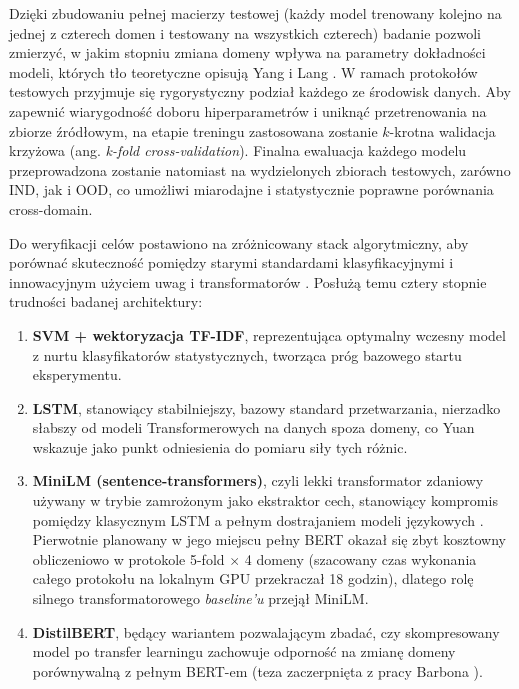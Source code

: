 \documentclass[runningheads]{llncs}
\begin{document}
Dzięki zbudowaniu pełnej macierzy testowej (każdy model trenowany kolejno na jednej z czterech domen i testowany na wszystkich czterech) badanie pozwoli zmierzyć, w jakim stopniu zmiana domeny wpływa na parametry dokładności modeli, których tło teoretyczne opisują Yang i Lang \cite{yang2023outofdistributiongeneralizationtextclassification,lang2023surveyoutofdistributiondetectionnlp}. W ramach protokołów testowych przyjmuje się rygorystyczny podział każdego ze środowisk danych. Aby zapewnić wiarygodność doboru hiperparametrów i uniknąć przetrenowania na zbiorze źródłowym, na etapie treningu zastosowana zostanie $k$-krotna walidacja krzyżowa (ang. \textit{k-fold cross-validation}). Finalna ewaluacja każdego modelu przeprowadzona zostanie natomiast na wydzielonych zbiorach testowych, zarówno IND, jak i OOD, co umożliwi miarodajne i statystycznie poprawne porównania cross-domain.

Do weryfikacji celów postawiono na zróżnicowany stack algorytmiczny, aby porównać skuteczność pomiędzy starymi standardami klasyfikacyjnymi i innowacyjnym użyciem uwag i transformatorów \cite{DBLP:journals/corr/abs-1109-6341,s22218184}. Posłużą temu cztery stopnie trudności badanej architektury:
\begin{enumerate}
    \item \textbf{SVM + wektoryzacja TF-IDF}, reprezentująca optymalny wczesny model z nurtu klasyfikatorów statystycznych, tworząca próg bazowego startu eksperymentu.
    \item \textbf{LSTM}, stanowiący stabilniejszy, bazowy standard przetwarzania, nierzadko słabszy od modeli Transformerowych na danych spoza domeny, co Yuan \cite{Yuan2026EmpiricalSO} wskazuje jako punkt odniesienia do pomiaru siły tych różnic.
    \item \textbf{MiniLM (sentence-transformers)}, czyli lekki transformator zdaniowy używany w trybie zamrożonym jako ekstraktor cech, stanowiący kompromis pomiędzy klasycznym LSTM a pełnym dostrajaniem modeli językowych \cite{wang2020minilm,reimers-2019-sentence-bert}. Pierwotnie planowany w jego miejscu pełny BERT okazał się zbyt kosztowny obliczeniowo w protokole 5-fold $\times$ 4 domeny (szacowany czas wykonania całego protokołu na lokalnym GPU przekraczał 18 godzin), dlatego rolę silnego transformatorowego \textit{baseline'u} przejął MiniLM.
    \item \textbf{DistilBERT}, będący wariantem pozwalającym zbadać, czy skompresowany model po transfer learningu zachowuje odporność na zmianę domeny porównywalną z pełnym BERT-em (teza zaczerpnięta z pracy Barbona \cite{s22218184,sanh2019distilbert}).
\end{enumerate}
\end{document}

